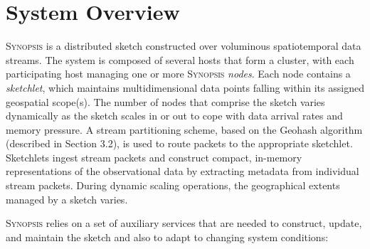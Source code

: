 \section{System Overview}
\label{sec:system}
\textsc{Synopsis} is a distributed sketch constructed over voluminous spatiotemporal data streams.
The system is composed of several hosts that form a cluster, with each participating host managing one or more \textsc{Synopsis} \emph{nodes}.
Each node contains a \emph{sketchlet}, which maintains multidimensional data points falling within its assigned geospatial scope(s).
The number of nodes that comprise the sketch varies dynamically as the sketch scales in or out to cope with data arrival rates and memory pressure.
A stream partitioning scheme, based on the Geohash algorithm (described in Section 3.2), is used to route packets to the appropriate sketchlet.
Sketchlets ingest stream packets and construct compact, in-memory representations of the observational data by extracting metadata from individual stream packets.
During dynamic scaling operations, the geographical extents managed by a sketch varies.

\textsc{Synopsis} relies on a set of auxiliary services that are needed to construct, update, and maintain the sketch and also to adapt to changing system conditions:

